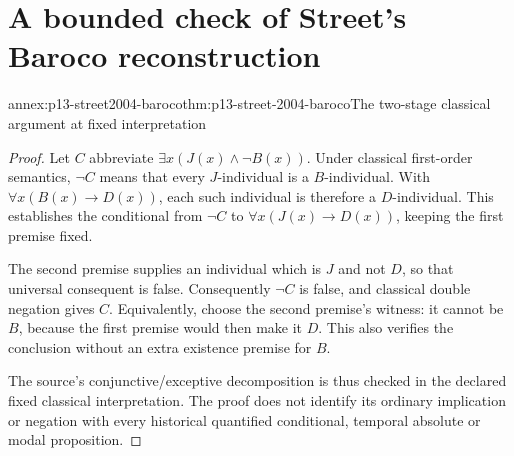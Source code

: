 \section{A bounded check of Street's Baroco reconstruction}
\label{sec:annex-p13-street-arabic-2004}

\begin{annexitem}{annex:p13-street2004-baroco}{thm:p13-street-2004-baroco}{The two-stage classical argument at fixed interpretation}
\begin{proof}
Let \(C\) abbreviate \(\exists x(J(x)\land\neg B(x))\).
Under classical first-order semantics, \(\neg C\) means
that every \(J\)-individual is a \(B\)-individual. With
\(\forall x(B(x)\to D(x))\), each such individual is
therefore a \(D\)-individual. This establishes the
conditional from \(\neg C\) to
\(\forall x(J(x)\to D(x))\), keeping the first premise fixed.

The second premise supplies an individual which is \(J\)
and not \(D\), so that universal consequent is false.
Consequently \(\neg C\) is false, and classical double
negation gives \(C\). Equivalently, choose the second
premise's witness: it cannot be \(B\), because the first
premise would then make it \(D\). This also verifies
the conclusion without an extra existence premise for \(B\).

The source's conjunctive/exceptive decomposition is thus
checked in the declared fixed classical interpretation.
The proof does not identify its ordinary implication or
negation with every historical quantified conditional,
temporal absolute or modal proposition.
\end{proof}
\end{annexitem}
